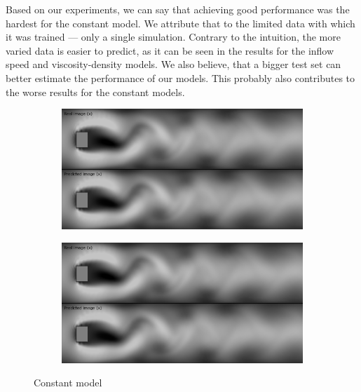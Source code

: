 \documentclass{llncs}
\begin{document}
Based on our experiments, we can say that achieving good performance was the hardest for the constant model. We attribute that to the limited data with which it was trained --- only a single simulation. Contrary to the intuition, the more varied data is easier to predict, as it can be seen in the results for the inflow speed and viscosity-density models. We also believe, that a bigger test set can better estimate the performance of our models. This probably also contributes to the worse results for the constant models.

\begin{figure}  

  \begin{subfigure}{.5\textwidth}
    \centering
    \includegraphics[width=1\linewidth]{imgs/single_constant_x}

  \end{subfigure}  
  \begin{subfigure}{.5\textwidth}
    \centering
    \includegraphics[width=1\linewidth]{imgs/single_constant_y}  

  \end{subfigure}
  \begin{center}
    Constant model
  \end{center}
  

\end{figure}
\end{document}
